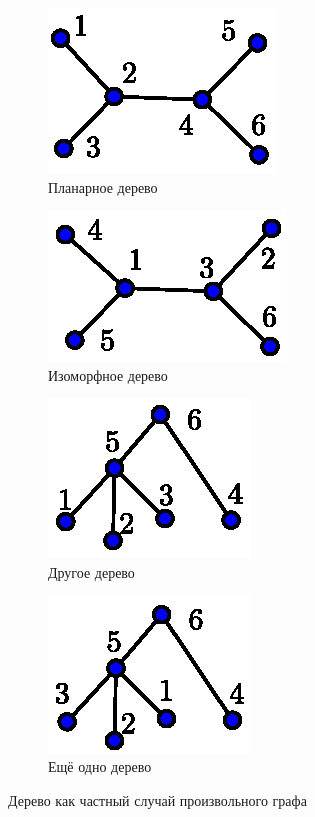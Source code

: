\documentclass[a5paper]{article}
\theoremstyle{definition}
\begin{document}
\begin{figure}[h]
\centering
\begin{subfigure}{.22\textwidth}
   	\centering
	\includegraphics[width=.5\textwidth]{planar_nonrooted.eps}
	\caption{Планарное дерево}
	\label{fig:planar_1}	
\end{subfigure}%
\begin{subfigure}{.22\textwidth}
	\centering
	\includegraphics[width=.5\textwidth]{planar_nonrooted_2.eps}
	\caption{Изоморфное дерево}
	\label{fig:planar_2}	
\end{subfigure}%
\begin{subfigure}{.22\textwidth}
	\centering
	\includegraphics[width=.5\textwidth]{planar_nonrooted_3.eps}
	\caption{Другое дерево}
	\label{fig:planar_3}	
\end{subfigure}%
\begin{subfigure}{.22\textwidth}
	\centering
	\includegraphics[width=.5\textwidth]{planar_nonrooted_4.eps}
	\caption{Ещё одно дерево}
	\label{fig:planar_4}	
\end{subfigure}
\caption{Дерево как частный случай произвольного графа}
\end{figure}
\end{document}

